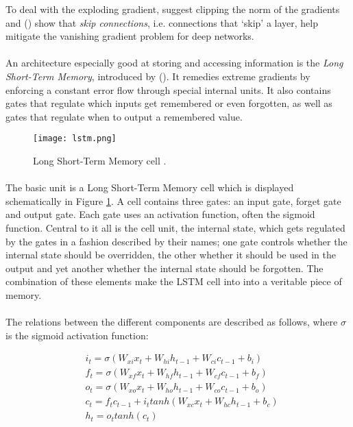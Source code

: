 To deal with the exploding gradient,
\parencite{Pascanu2012}
suggest clipping the norm of the gradients
and
\citeauthor{Graves2013} (\citeyear{Graves2013})
show that \textit{skip connections},
i.e. connections that `skip' a layer,
help mitigate the vanishing gradient problem
for deep networks.

\paragraph{}
An architecture especially good at storing and accessing information
is the \textit{Long Short-Term Memory},
introduced by \citeauthor{Hochreiter1997} (\citeyear{Hochreiter1997}).
It remedies extreme gradients
by enforcing a constant error flow through special internal units.
It also contains gates that regulate
which inputs get remembered or even forgotten,
as well as gates that regulate when to output a remembered value.

\begin{figure}[htpb]
  \centering
  \texttt{[image: lstm.png]}
  \caption{Long Short-Term Memory cell
  \parencite{Graves2013}.
  }
  \label{fig:lstm}
\end{figure}

\paragraph{}
The basic unit is a Long Short-Term Memory cell
which is displayed schematically in Figure \ref{fig:lstm}.
A cell contains three gates:
an input gate, forget gate and output gate.
Each gate uses an activation function,
often the sigmoid function.
Central to it all is the cell unit, the internal state,
which gets regulated by the gates
in a fashion described by their names;
one gate controls whether the internal state should be overridden,
the other whether it should be used in the output
and yet another whether the internal state should be forgotten.
The combination of these elements make the LSTM cell into
into a veritable piece of memory.

\paragraph{}
The relations between the different components are described as follows,
where $\sigma$ is the sigmoid activation function:

\begin{align}
  &i_t = \sigma(W_{xi}x_t + W_{hi}h_{t-1}+W_{ci}c_{t-1} + b_i) \\
  &f_t = \sigma(W_{xf}x_t + W_{hf}h_{t-1}+W_{cf}c_{t-1} + b_f) \\
  &o_t = \sigma(W_{xo}x_t + W_{ho}h_{t-1}+W_{co}c_{t-1} + b_o) \\
  &c_t = f_tc_{t-1}+i_t tanh(W_{xc}x_t+W_{hc}h_{t-1}+b_c) \\
  &h_t = o_t tanh(c_t)
\end{align}

